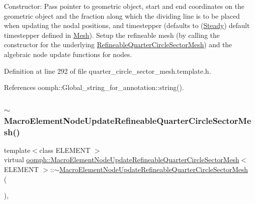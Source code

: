 Constructor\+: Pass pointer to geometric object, start and end coordinates on the geometric object and the fraction along which the dividing line is to be placed when updating the nodal positions, and timestepper (defaults to (\hyperlink{classoomph_1_1Steady}{Steady}) default timestepper defined in \hyperlink{classoomph_1_1Mesh}{Mesh}). Setup the refineable mesh (by calling the constructor for the underlying \hyperlink{classoomph_1_1RefineableQuarterCircleSectorMesh}{Refineable\+Quarter\+Circle\+Sector\+Mesh}) and the algebraic node update functions for nodes. 



Definition at line 292 of file quarter\+\_\+circle\+\_\+sector\+\_\+mesh.\+template.\+h.



References oomph\+::\+Global\+\_\+string\+\_\+for\+\_\+annotation\+::string().

\mbox{\label{classoomph_1_1MacroElementNodeUpdateRefineableQuarterCircleSectorMesh_a2d8953d309eba614524fce77c44c8d46}} 
\subsubsection{\texorpdfstring{$\sim$\+Macro\+Element\+Node\+Update\+Refineable\+Quarter\+Circle\+Sector\+Mesh()}{~MacroElementNodeUpdateRefineableQuarterCircleSectorMesh()}}
{\footnotesize\ttfamily template$<$class E\+L\+E\+M\+E\+NT $>$ \\
virtual \hyperlink{classoomph_1_1MacroElementNodeUpdateRefineableQuarterCircleSectorMesh}{oomph\+::\+Macro\+Element\+Node\+Update\+Refineable\+Quarter\+Circle\+Sector\+Mesh}$<$ E\+L\+E\+M\+E\+NT $>$\+::$\sim$\hyperlink{classoomph_1_1MacroElementNodeUpdateRefineableQuarterCircleSectorMesh}{Macro\+Element\+Node\+Update\+Refineable\+Quarter\+Circle\+Sector\+Mesh} (\begin{DoxyParamCaption}{ }\end{DoxyParamCaption})\hspace{0.3cm}{\ttfamily [inline]}, {\ttfamily [virtual]}}



